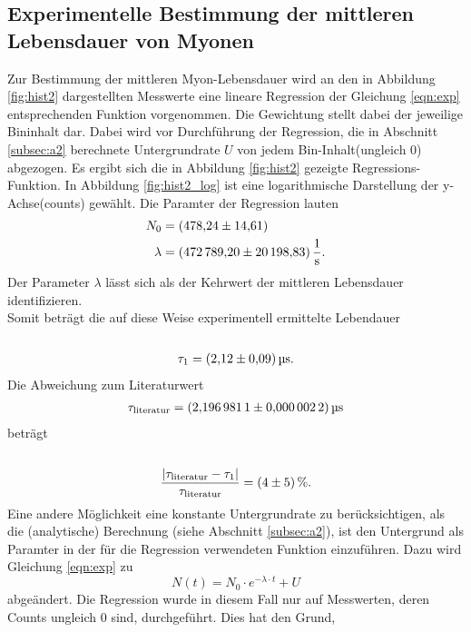 \subsection{Experimentelle Bestimmung der mittleren Lebensdauer von Myonen}
\label{subsec:a3}
Zur Bestimmung der mittleren Myon-Lebensdauer wird an den in Abbildung \ref{fig:hist2}
dargestellten Messwerte eine lineare Regression der Gleichung \eqref{eqn:exp} entsprechenden Funktion
vorgenommen. Die Gewichtung stellt dabei der jeweilige Bininhalt dar. Dabei wird vor Durchführung der Regression, die in Abschnitt \ref{subsec:a2} berechnete
Untergrundrate $U$ von jedem Bin-Inhalt(ungleich $0$) abgezogen. Es ergibt sich die in Abbildung \ref{fig:hist2}
gezeigte Regressions-Funktion. In Abbildung \ref{fig:hist2_log} ist eine logarithmische Darstellung der y-Achse(counts) gewählt. Die Paramter der Regression lauten
\begin{align*}
  N_0 &= \SI{478.24+-14.61}{}\\
  \lambda &= \SI{472789.20+-20198.83}{\per\second} .
\end{align*}
Der Parameter $\lambda$ lässt sich als der Kehrwert der mittleren Lebensdauer identifizieren.\\
Somit beträgt die auf diese Weise experimentell ermittelte Lebendauer \\ \\
\begin{align*}
  \tau_{1} = \SI{2.12+-0.09}{\micro\second} .
\end{align*}
Die Abweichung zum Literaturwert \cite{lebensdauer}
\begin{align*}
  \tau_\text{literatur} = \SI{2.1969811+-0.0000022}{\micro\second}
\end{align*}
beträgt\\ \\
\begin{align*}
  \frac{\lvert \tau_\text{literatur} - \tau_{1} \rvert}{\tau_\text{literatur}} = \SI{4+-5}{\percent} .
\end{align*}
Eine andere Möglichkeit eine konstante Untergrundrate zu berücksichtigen, als die (analytische) Berechnung (siehe Abschnitt \ref{subsec:a2}),
ist den Untergrund als Paramter in der für die Regression verwendeten Funktion einzuführen. Dazu
wird Gleichung \eqref{eqn:exp} zu
\begin{equation}
  \label{eqn:exp_untergrund}
  N(t) = N_{0} \cdot e^{-\lambda \cdot t} + U
\end{equation}
abgeändert. Die Regression wurde in diesem Fall nur auf Messwerten, deren Counts ungleich $0$ sind, durchgeführt. Dies hat den Grund,

